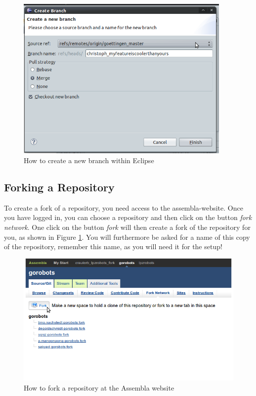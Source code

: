 \begin{figure}[h!]
 \begin{center}
 \includegraphics[height=8cm]{./Pics/NewBranchSmall.png}
\end{center}
\caption{How to create a new branch within Eclipse}
\end{figure}



\newpage

\subsection{Forking a Repository}
\label{forksection}
To create a fork of a repository, you need access to the assembla-website. Once you have logged in, you can choose a repository and then click on the button \emph{fork network}.
One click on the button \emph{fork} will then create a fork of the repository for you, as shown in Figure \ref{fork}. You will furthermore be asked for a name of this copy of the repository, remember this name, as you will need it for the setup!

\begin{figure}[h!]
\begin{center}
\includegraphics[width=12cm]{./Pics/Fork.png}
\caption{How to fork a repository at the Assembla website}
\label{fork}
\end{center}
\end{figure}


